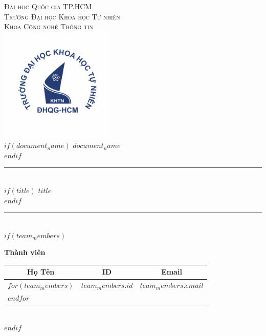 \documentclass[$if(fontsize)$$fontsize$,$endif$$if(papersize)$$papersize$paper,$endif$$for(classoption)$$classoption$$sep$,$endfor$]{$documentclass$}
\renewcommand{\arraystretch}{1.4}
\begin{document}
\begin{titlepage}
\begin{center}

{\Large\textsc{Đại học Quốc gia TP.HCM}}\\[0.2cm]
{\Large\textsc{Trường Đại học Khoa học Tự nhiên}}\\[0.2cm]
{\Large\textsc{Khoa Công nghệ Thông tin}}\\[1cm]

\includegraphics[width=5.5cm]{./title/logo.png}\\[0cm]

$if(document_name)$
{\Large\bfseries $document_name$}\\[0.7cm]
$endif$

\rule{\linewidth}{0.2mm}\\[0.6cm] %
$if(title)${\huge\bfseries\color{accent} $title$}\\[0.3cm]$endif$
\rule{\linewidth}{0.2mm}\\[0.6cm]

$if(team_members)$
\begin{minipage}{\textwidth}
\begin{center}
\large\textbf{Thành viên}\\[0.3cm]

\setlength{\arrayrulewidth}{0.3pt} %
\setlength{\doublerulesep}{1.5pt}  %
\renewcommand{\arraystretch}{1.8}
\begin{tabular}{@{}p{4.5cm}@{}p{3cm}@{}p{5cm}@{}}
\toprule
\multicolumn{1}{c}{\textbf{Họ Tên}} & \multicolumn{1}{c}{\textbf{ID}} & \multicolumn{1}{c}{\textbf{Email}} \\
\midrule
$for(team_members)$
\multicolumn{1}{c}{$team_members.name$} & \multicolumn{1}{c}{$team_members.id$} & \multicolumn{1}{c}{$team_members.email$} \\
$endfor$
\bottomrule
\end{tabular}
\end{center}
\end{minipage}\\[0.8cm]
$endif$


\end{center}
\end{titlepage}
\end{document}
